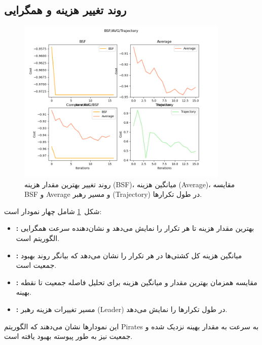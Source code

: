 \subsection{روند تغییر هزینه و همگرایی}
\begin{figure}[h!]
    \centering
    \includegraphics[width=0.9\textwidth]{images/pirates_bsf_avg_trajectory.png}
    \caption{روند تغییر بهترین مقدار هزینه (BSF)، میانگین هزینه (Average)، مقایسه BSF و Average و مسیر رهبر (Trajectory) در طول تکرارها.}
    \label{fig:pirates_bsf_avg_trajectory}
\end{figure}

شکل~\ref{fig:pirates_bsf_avg_trajectory} شامل چهار نمودار است:
\begin{itemize}
    \item \textbf{:} بهترین مقدار هزینه تا هر تکرار را نمایش می‌دهد و نشان‌دهنده سرعت همگرایی الگوریتم است.
    \item \textbf{:} میانگین هزینه کل کشتی‌ها در هر تکرار را نشان می‌دهد که بیانگر روند بهبود جمعیت است.
    \item \textbf{:} مقایسه همزمان بهترین مقدار و میانگین هزینه برای تحلیل فاصله جمعیت تا نقطه بهینه.
    \item \textbf{:} مسیر تغییرات هزینه رهبر (Leader) در طول تکرارها را نمایش می‌دهد.
\end{itemize}
این نمودارها نشان می‌دهند که الگوریتم Pirates به سرعت به مقدار بهینه نزدیک شده و جمعیت نیز به طور پیوسته بهبود یافته است.

